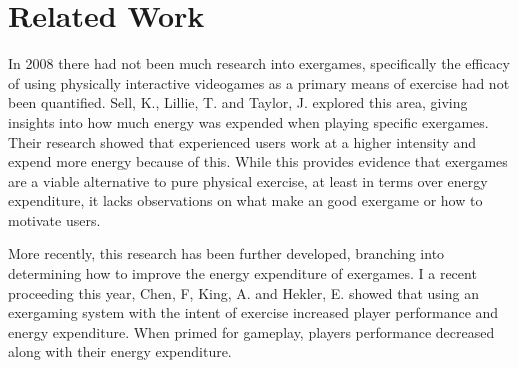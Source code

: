 \documentclass[a4paper]{article}
\begin{document}
\section{Related Work}
\begin{multicols}{2}
In 2008 there had not been much research into exergames, specifically the efficacy of using physically interactive videogames as a primary means of exercise had not been quantified. Sell, K., Lillie, T. and Taylor, J. \cite{sell2008energy} explored this area, giving insights into how much energy was expended when playing specific exergames. Their research showed that experienced users work at a higher intensity and expend more energy because of this. While this provides evidence that exergames are a viable alternative to pure physical exercise, at least in terms over energy expenditure, it lacks observations on what make an good exergame or how to motivate users.

More recently, this research has been further developed, branching into determining how to improve the energy expenditure of exergames. I a recent proceeding this year, Chen, F, King, A. and Hekler, E. \cite{chen2014healthifying} showed that using an exergaming system with the intent of exercise increased player performance and energy expenditure. When primed for gameplay, players performance decreased along with their energy expenditure.



\end{multicols}



\end{document}

